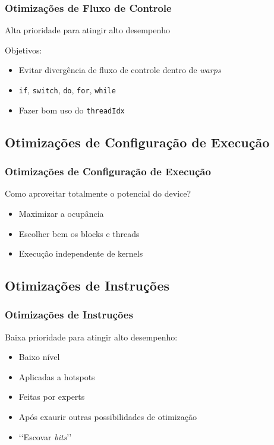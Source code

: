 \documentclass[10pt, compress]{beamer}
\begin{document}
\begin{frame}
    \frametitle{Otimizações de Fluxo de Controle}
    \alert{Alta prioridade} para atingir \alert{alto desempenho}
    \pause

    Objetivos:
    \begin{itemize}
        \item Evitar \alert{divergência de fluxo de controle} dentro de
            \textit{warps}
            \pause
        \item \texttt{\alert{if}}, \texttt{\alert{switch}},
            \texttt{\alert{do}}, \texttt{\alert{for}}, \texttt{\alert{while}}
            \pause
        \item Fazer bom uso do \texttt{\alert{threadIdx}}
    \end{itemize}
\end{frame}

\subsection{Otimizações de Configuração de Execução}

\begin{frame}
    \frametitle{Otimizações de Configuração de Execução}
    Como aproveitar totalmente o potencial do \alert{device}?
    \pause
    \begin{itemize}
        \item Maximizar a \alert{ocupância}
            \pause
        \item Escolher bem os \alert{blocks} e \alert{threads}
            \pause
        \item Execução independente de \alert{kernels}
    \end{itemize}
\end{frame}

\subsection{Otimizações de Instruções}

\begin{frame}
    \frametitle{Otimizações de Instruções}
    \alert{Baixa prioridade} para atingir \alert{alto desempenho}:
    \pause
    \begin{itemize}
        \item \alert{Baixo nível}
            \pause
        \item Aplicadas a \alert{hotspots}
            \pause
        \item Feitas por \alert{experts}
        \item Após \alert{exaurir} outras possibilidades de otimização
            \pause
        \item \lq\lq{}\alert{Escovar \textit{bits}}\rq\rq{} \smiley{}
    \end{itemize}
\end{frame}
\end{document}

